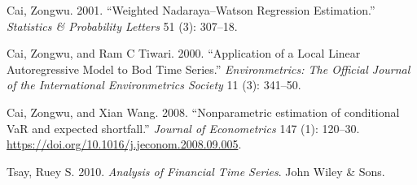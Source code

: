 \documentclass[
]{article}
\newlength{\cslhangindent}
\newenvironment{cslreferences}%
  {\setlength{\parindent}{0pt}%
  \everypar{\setlength{\hangindent}{\cslhangindent}}\ignorespaces}%
  {\par}
\theoremstyle{definition}
\theoremstyle{definition}
\theoremstyle{definition}
\theoremstyle{remark}
\begin{document}
\hypertarget{refs}{}
\begin{cslreferences}
\leavevmode\hypertarget{ref-cai2001weighted}{}%
Cai, Zongwu. 2001. ``Weighted Nadaraya--Watson Regression Estimation.'' \emph{Statistics \& Probability Letters} 51 (3): 307--18.

\leavevmode\hypertarget{ref-cai2000application}{}%
Cai, Zongwu, and Ram C Tiwari. 2000. ``Application of a Local Linear Autoregressive Model to Bod Time Series.'' \emph{Environmetrics: The Official Journal of the International Environmetrics Society} 11 (3): 341--50.

\leavevmode\hypertarget{ref-cai:2008aa}{}%
Cai, Zongwu, and Xian Wang. 2008. ``Nonparametric estimation of conditional VaR and expected shortfall.'' \emph{Journal of Econometrics} 147 (1): 120--30. \url{https://doi.org/10.1016/j.jeconom.2008.09.005}.

\leavevmode\hypertarget{ref-Tsay:2010aa}{}%
Tsay, Ruey S. 2010. \emph{Analysis of Financial Time Series}. John Wiley \& Sons.
\end{cslreferences}
\end{document}
